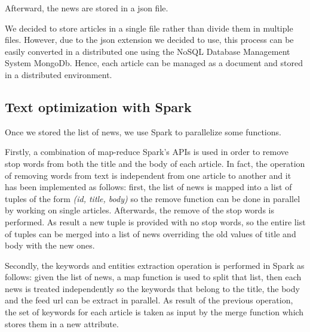 \documentclass{acm_proc_article-sp}
\begin{document}


Afterward, the news are stored in a json file.

We decided to store articles in a single file rather than divide them in multiple files. However, due to the json extension we decided to use, this process can be easily converted in a distributed one using the NoSQL Database Management System MongoDb. Hence, each article can be managed as a document and stored in a distributed environment.

\subsection{Text optimization with Spark}
\vspace{2mm}
Once we stored the list of news, we use Spark to parallelize some functions.


Firstly, a combination of map-reduce Spark's APIs is used in order to remove stop words from both the title and the body of each article. In fact, the operation of removing words from text is independent from one article to another and it has been implemented as follows: first, the list of news is mapped into a list of tuples of the form \textit{(id, title, body)} so the remove function can be done in parallel by working on single articles. Afterwards, the remove of the stop words is performed. As result a new tuple is provided with no stop words, so the entire list of tuples can be merged into a list of news overriding the old values of title and body with the new ones.



Secondly, the keywords and entities extraction operation is performed in Spark as follows: given the list of news, a map function is used to split that list, then each news is treated independently so the keywords that belong to the title, the body and the feed url can be extract in parallel. As result of the previous operation, the set of keywords for each article is taken as input by the merge function which stores them in a new attribute.
\end{document}
